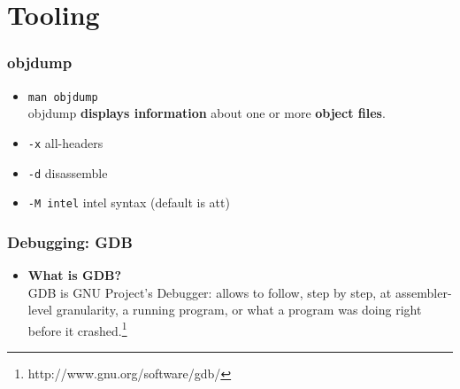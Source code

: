 \documentclass[]{beamer}
\begin{document}
\section{Tooling}

\begin{frame}
  \frametitle{objdump}
  \begin{itemize}
  \item{{\tt man objdump}}\\
objdump \textbf{displays information} about one or more \textbf{object files}.
  \item{\texttt{-x}} all-headers
  \item{\texttt{-d}} disassemble
  \item{\texttt{-M intel}} intel syntax (default is att)
  \end{itemize}
\end{frame}

\begin{frame}
  \frametitle{Debugging: GDB}
  \begin{itemize}
  \item{{\bf What is GDB?}}\\
    GDB is GNU Project's Debugger: allows to follow, step by step, at assembler-level granularity, a running program, or what a program was doing right before it crashed.\footnote{http://www.gnu.org/software/gdb/}
  \end{itemize}
\end{frame}
\end{document}
